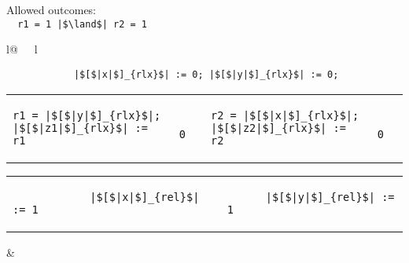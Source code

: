 \begin{minipage}[t]{0.2\linewidth}
Allowed outcomes:\\
\lstinline{  r1 = 1 |$\land$| r2 = 1}\\
\end{minipage}
%
\begin{minipage}[t]{0.4\linewidth}
\vspace{-.2cm}
  \begin{tabular}{l@{\ \ \ }l}
    \begin{minipage}[l]{4.3cm} \small
\begin{lstlisting}
            |$[$|x|$]_{rlx}$| := 0; |$[$|y|$]_{rlx}$| := 0;
\end{lstlisting}
\vspace{-.2cm}
\begin{tabular}{l||l||l||l}
\begin{lstlisting}
r1 = |$[$|y|$]_{rlx}$|;
|$[$|z1|$]_{rlx}$| := r1
\end{lstlisting}
\hspace{.6cm}
&
\begin{lstlisting}
  0
\end{lstlisting}
\hspace{.6cm}
&
\begin{lstlisting}
r2 = |$[$|x|$]_{rlx}$|;
|$[$|z2|$]_{rlx}$| := r2
\end{lstlisting}
\hspace{.6cm}
&
\begin{lstlisting}
  0
\end{lstlisting}
\end{tabular}

\vspace{-1pt}
\begin{tabular}{l||l}
  \begin{lstlisting}
            |$[$|x|$]_{rel}$| := 1
  \end{lstlisting}
\hspace{2.52em}
&
  \begin{lstlisting}
      |$[$|y|$]_{rel}$| := 1
  \end{lstlisting}
\end{tabular}
    \end{minipage}
&
  \end{tabular}
\end{minipage}
\litmusTestEnd

